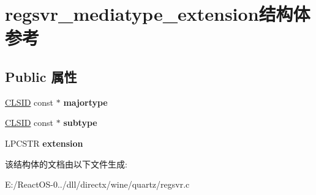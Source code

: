 \hypertarget{structregsvr__mediatype__extension}{}\section{regsvr\+\_\+mediatype\+\_\+extension结构体 参考}
\label{structregsvr__mediatype__extension}
\subsection*{Public 属性}
\begin{DoxyCompactItemize}
\item 
\mbox{\label{structregsvr__mediatype__extension_a0c55c70b9f2d94ec46a1a714d3557491}} 
\hyperlink{struct___i_i_d}{C\+L\+S\+ID} const  $\ast$ {\bfseries majortype}
\item 
\mbox{\label{structregsvr__mediatype__extension_aae1909bed3ccb1e15d868912bd572153}} 
\hyperlink{struct___i_i_d}{C\+L\+S\+ID} const  $\ast$ {\bfseries subtype}
\item 
\mbox{\label{structregsvr__mediatype__extension_a5dde3001b465ab6a9dc1658d06515430}} 
L\+P\+C\+S\+TR {\bfseries extension}
\end{DoxyCompactItemize}


该结构体的文档由以下文件生成\+:\begin{DoxyCompactItemize}
\item 
E\+:/\+React\+O\+S-\/0../dll/directx/wine/quartz/regsvr.\+c\end{DoxyCompactItemize}
